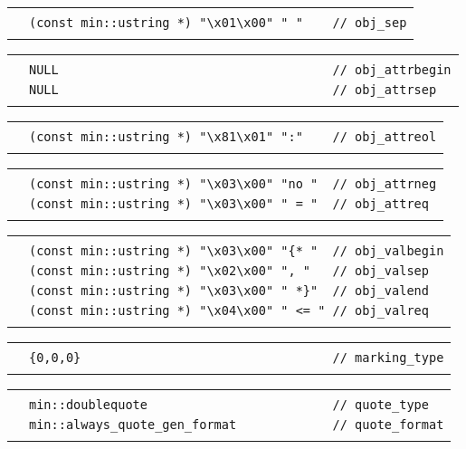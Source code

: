 \documentclass[12pt]{article}
\newenvironment{indpar}[1][0.3in]%
	{\begin{list}{}%
		     {\setlength{\itemsep}{0in}%
		      \setlength{\topsep}{0in}%
		      \setlength{\parsep}{1ex}%
		      \setlength{\labelwidth}{#1}%
		      \setlength{\leftmargin}{#1}%
		      \addtolength{\leftmargin}{\labelsep}}%
	 \item}%
	{\end{list}}
\newlength{\ARGBREAKLENGTH}
\newcommand{\ARGBREAK}[1][\ARGBREAKLENGTH]{\\&\hspace*{#1}}
\begin{document}
\begin{indpar}[1em]
\vspace{-4ex}\begin{tabular}{r@{}l}\hspace*{0.1in}\ARGBREAK
\verb|(const min::ustring *) "\x01\x00" " "    // obj_sep|\ARGBREAK
\end{tabular}

\vspace{-4ex}\begin{tabular}{r@{}l}\hspace*{0.1in}\ARGBREAK
\verb|NULL                                     // obj_attrbegin|\ARGBREAK
\verb|NULL                                     // obj_attrsep|\ARGBREAK
\end{tabular}

\vspace{-4ex}\begin{tabular}{r@{}l}\hspace*{0.1in}\ARGBREAK
\verb|(const min::ustring *) "\x81\x01" ":"    // obj_attreol|\ARGBREAK
\end{tabular}

\vspace{-4ex}\begin{tabular}{r@{}l}\hspace*{0.1in}\ARGBREAK
\verb|(const min::ustring *) "\x03\x00" "no "  // obj_attrneg|\ARGBREAK
\verb|(const min::ustring *) "\x03\x00" " = "  // obj_attreq|\ARGBREAK
\end{tabular}

\vspace{-4ex}\begin{tabular}{r@{}l}\hspace*{0.1in}\ARGBREAK
\verb|(const min::ustring *) "\x03\x00" "{* "  // obj_valbegin|\ARGBREAK
\verb|(const min::ustring *) "\x02\x00" ", "   // obj_valsep|\ARGBREAK
\verb|(const min::ustring *) "\x03\x00" " *}"  // obj_valend|\ARGBREAK
\verb|(const min::ustring *) "\x04\x00" " <= " // obj_valreq|\ARGBREAK
\end{tabular}

\vspace{-4ex}\begin{tabular}{r@{}l}\hspace*{0.1in}\ARGBREAK
\verb|{0,0,0}                                  // marking_type|\ARGBREAK
\end{tabular}

\vspace{-4ex}\begin{tabular}{r@{}l}\hspace*{0.1in}\ARGBREAK
\verb|min::doublequote                         // quote_type|\ARGBREAK
\verb|min::always_quote_gen_format             // quote_format|\ARGBREAK
\end{tabular}


\end{indpar}
\end{document}

